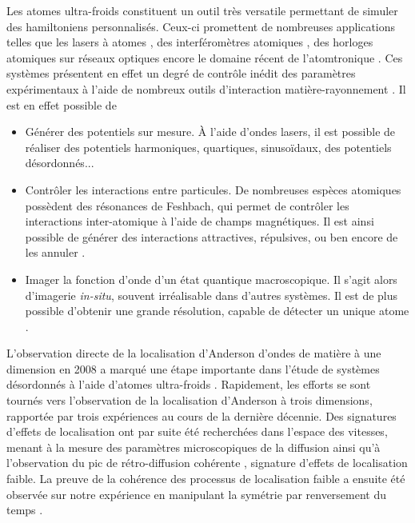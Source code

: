 Les atomes ultra-froids constituent un outil très versatile permettant de simuler des hamiltoniens personnalisés. Ceux-ci promettent de nombreuses applications telles que les lasers à atomes \citep{robins2013atom}, des interféromètres atomiques \citep{canuel2014matter}, des horloges atomiques sur réseaux optiques \citep{derevianko2011colloquium} encore le domaine récent de l'atomtronique \citep{eckel2014hysteresis}. Ces systèmes présentent en effet un degré de contrôle inédit des paramètres expérimentaux à l'aide de nombreux outils d'interaction matière-rayonnement \citep{bloch2012quantum}. Il est en effet possible de
\begin{itemize}
\item[\textendash] Générer des potentiels sur mesure. À l'aide d'ondes lasers, il est possible de réaliser des potentiels harmoniques, quartiques, sinusoïdaux, des potentiels désordonnés...
\item[\textendash] Contrôler les interactions entre particules. De nombreuses espèces atomiques possèdent des résonances de Feshbach, qui permet de contrôler les interactions inter-atomique à l'aide de champs magnétiques. Il est ainsi possible de générer des interactions attractives, répulsives, ou ben encore de les annuler \citep{walraven2010elements}.
\item[\textendash] Imager la fonction d'onde d'un état quantique macroscopique. Il s'agit alors d'imagerie \emph{in-situ}, souvent irréalisable dans d'autres systèmes. Il est de plus possible d'obtenir une grande résolution, capable de détecter un unique atome \citep{ott2016single}.
\end{itemize}



L'observation directe de la localisation d'Anderson d'ondes de matière à une dimension en 2008 a marqué une étape importante dans l'étude de systèmes désordonnés à l'aide d'atomes ultra-froids \citep{roati2008anderson}\citep{billy2008direct}. Rapidement, les efforts se sont tournés vers l'observation de la localisation d'Anderson à trois dimensions, rapportée par trois expériences \citep{kondov2011three}\citep{jendrzejewski2012three}\citep{semeghini2015measurement} au cours de la dernière décennie. Des signatures d'effets de localisation ont par suite été recherchées dans l'espace des vitesses, menant à la mesure des paramètres microscopiques de la diffusion \citep{richard2019elastic} ainsi qu'à l'observation du pic de rétro-diffusion cohérente \citep{jendrzejewski2012coherent}, signature d'effets de localisation faible. La preuve de la cohérence des processus de localisation faible a ensuite été observée sur notre expérience en manipulant la symétrie par renversement du temps \citep{muller2015suppression}.

